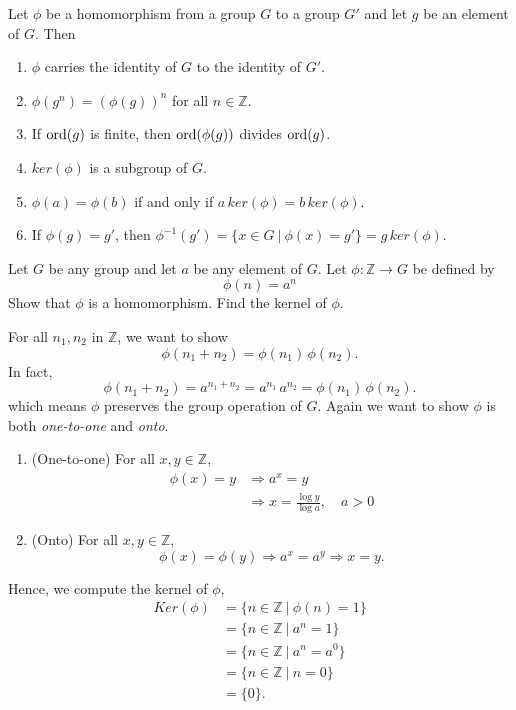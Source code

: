 \begin{theorem}
    Let $\phi$ be a homomorphism from a group $G$ to a group $G'$ and let $g$ be an element of $G$. Then
    \begin{enumerate}
        \item $\phi$ carries the identity of $G$ to the identity of $G'$.
        \item $\phi(g^n) = \left( \phi(g) \right)^n$ for all $n \in \mathbb{Z}$.
        \item If $\operatorname{ord}(g)$ is finite, then $\operatorname{ord}(\phi(g))$ divides $\operatorname{ord}(g)$.
        \item $ker(\phi)$ is a subgroup of $G$.
        \item $\phi(a) = \phi(b)$ if and only if $a\, ker(\phi) = b\, ker(\phi)$.
        \item If $\phi(g)= g'$, then $\phi^{-1}(g') = \{ x \in G \> | \> \phi(x) = g' \} = g\, ker(\phi)$.
    \end{enumerate}
\end{theorem}

\begin{example}
    Let $G$ be any group and let $a$ be any element of $G$. Let $\phi: \mathbb{Z} \to G$ be defined by 
    \[
        \phi(n) = a^n
    \]
    Show that $\phi$ is a homomorphism. Find the kernel of $\phi$.
\end{example}
\begin{solution}
    For all $n_1, n_2$ in $\mathbb{Z}$, we want to show
    \[
        \phi(n_1 + n_2) = \phi(n_1)\, \phi(n_2).
    \]
    In fact, 
    \[
        \phi(n_1 + n_2) = a^{n_1 + n_2} = a^{n_1}\, a^{n_2} = \phi(n_1)\, \phi(n_2).
    \]
    which means $\phi$ preserves the group operation of $G$. Again we want to show $\phi$ 
    is both \textit{one-to-one} and \textit{onto}.

    \begin{enumerate}
        \item (One-to-one) For all $x, y \in \mathbb{Z}$, 
        \begin{align*}
            \phi(x) = y &\Rightarrow a^x = y\\
            &\Rightarrow x = \frac{\log y}{ \log a}, \quad a > 0    
        \end{align*}

        \item (Onto) For all $x, y \in \mathbb{Z}$, 
        \[
            \phi(x) = \phi(y) \Rightarrow a^x = a^y \Rightarrow x = y.
        \]
    \end{enumerate}

    Hence, we compute the kernel of $\phi$,
    \begin{align*}
        Ker(\phi) &= \{ n \in \mathbb{Z} \> | \> \phi(n) = 1 \}\\
        &= \{ n\in \mathbb{Z} \> | \> a^n = 1 \}\\
        &= \{ n\in \mathbb{Z} \> | \> a^n = a^0 \}\\
        &= \{ n\in \mathbb{Z} \> | \> n = 0 \}\\
        &= \{ 0 \}.
    \end{align*}
\end{solution}

